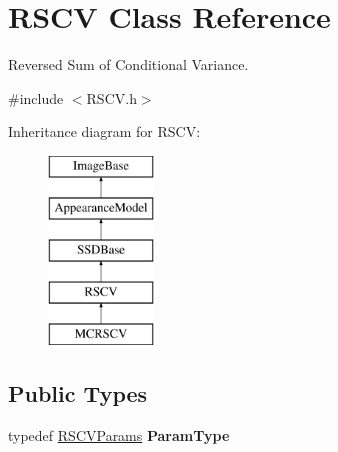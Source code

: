 \hypertarget{classRSCV}{\section{R\-S\-C\-V Class Reference}
\label{classRSCV}
}


Reversed Sum of Conditional Variance.  




{\ttfamily \#include $<$R\-S\-C\-V.\-h$>$}

Inheritance diagram for R\-S\-C\-V\-:\begin{figure}[H]
\begin{center}
\leavevmode
\includegraphics[height=5.000000cm]{classRSCV}
\end{center}
\end{figure}
\subsection*{Public Types}
\begin{DoxyCompactItemize}
\item 
\hypertarget{classRSCV_ace4a1a9614faf4d99e760e3cc916f654}{typedef \hyperlink{structRSCVParams}{R\-S\-C\-V\-Params} {\bfseries Param\-Type}}\label{classRSCV_ace4a1a9614faf4d99e760e3cc916f654}

\end{DoxyCompactItemize}

